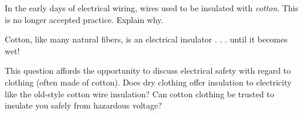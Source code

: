 

In the early days of electrical wiring, wires used to be insulated with {\it cotton}.  This is no longer accepted practice.  Explain why.







Cotton, like many natural fibers, is an electrical insulator . . . until it becomes wet!







This question affords the opportunity to discuss electrical safety with regard to clothing (often made of cotton).  Does dry clothing offer insulation to electricity like the old-style cotton wire insulation?  Can cotton clothing be trusted to insulate you safely from hazardous voltage?




